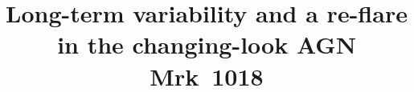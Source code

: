 \documentclass[twocolumn]{aastex63}
\begin{document}
\def\sectionautorefname{Section}
\def\subsectionautorefname{Section}

\title{Long-term variability and a re-flare in the changing-look AGN Mrk~1018}


\end{document}
